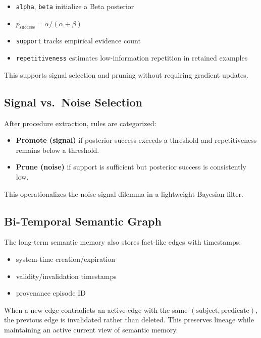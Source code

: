 \documentclass{article}
\begin{document}
\begin{itemize}[leftmargin=1.25em]
\item \texttt{alpha}, \texttt{beta} initialize a Beta posterior
\item $p_{\text{success}} = \alpha / (\alpha + \beta)$
\item \texttt{support} tracks empirical evidence count
\item \texttt{repetitiveness} estimates low-information repetition in retained examples
\end{itemize}

This supports signal selection and pruning without requiring gradient updates.

\subsection{Signal vs.\ Noise Selection}

After procedure extraction, rules are categorized:

\begin{itemize}[leftmargin=1.25em]
\item \textbf{Promote (signal)} if posterior success exceeds a threshold and repetitiveness remains below a threshold.
\item \textbf{Prune (noise)} if support is sufficient but posterior success is consistently low.
\end{itemize}

This operationalizes the noise-signal dilemma in a lightweight Bayesian filter.

\subsection{Bi-Temporal Semantic Graph}

The long-term semantic memory also stores fact-like edges with timestamps:

\begin{itemize}[leftmargin=1.25em]
\item system-time creation/expiration
\item validity/invalidation timestamps
\item provenance episode ID
\end{itemize}

When a new edge contradicts an active edge with the same $(\text{subject}, \text{predicate})$, the previous edge is invalidated rather than deleted. This preserves lineage while maintaining an active current view of semantic memory.
\end{document}
